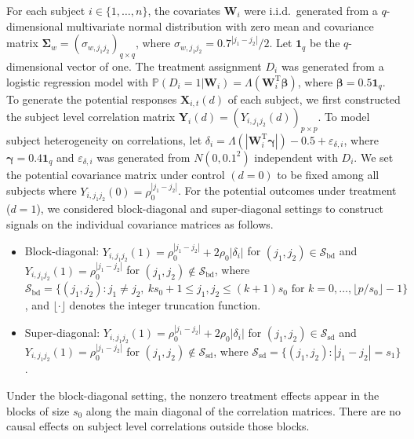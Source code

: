 \documentclass[12pt]{article}
\def\T{{ \mathrm{\scriptscriptstyle T} }}
\theoremstyle{definition}
\newcommand{\bW}{{\mathbf W}}
\newcommand{\bX}{{\mathbf X}}
\newcommand{\bY}{{\mathbf Y}}
\newcommand{\bbeta}  {\boldsymbol{\beta}}
\newcommand{\bSigma}{\boldsymbol{\Sigma}}
\newcommand{\bgamma}{\boldsymbol{\gamma}}
\begin{document}
For each subject $i \in \{1, \ldots, n\}$, the covariates $\bW_i$ were i.i.d.\ generated from a $q$-dimensional multivariate normal distribution with zero mean and covariance matrix $\bSigma_{w} = (\sigma_{w, j_1j_2})_{q \times q}$, where $\sigma_{w, j_1j_2} = 0.7^{|j_1-j_2|} / 2$.
Let $\mathbf{1}_q$ be the $q$-dimensional vector of one. 
The treatment assignment $D_i$ was generated from a logistic regression model with 
$\mathbb{P}(D_{i} = 1|\bW_i) = \Lambda(\bW_{i}^{\T}\bbeta)$, where 
$\bbeta = 0.5 \mathbf{1}_q$.
To generate the potential responses $\bX_{i, t}(d)$ of each subject, we first constructed the subject level correlation matrix $\bY_{i}(d) = (Y_{i, j_1j_2}(d))_{p \times p}$. 
To model subject heterogeneity on correlations, let $\delta_{i} = \Lambda(|\bW_{i}^{\T}\bgamma|) - 0.5 + \varepsilon_{\delta, i}$, where $\bgamma = 0.4 \mathbf{1}_q$ and $\varepsilon_{\delta, i}$ was generated from $N(0, 0.1^{2})$ 
independent with $D_i$. 
We set the potential covariance matrix under control $(d = 0)$ to be fixed among all subjects where $Y_{i, j_1j_2}(0) = \rho_{0}^{|j_1-j_2|}$. 
For the potential outcomes under treatment ($d = 1$), we considered block-diagonal and super-diagonal settings to construct signals on the individual covariance matrices as follows.
\begin{itemize}
\item Block-diagonal: $Y_{i, j_1j_2}(1) = \rho_{0}^{|j_1-j_2|} +2 \rho_{0}|\delta_{i}| $ for $(j_1, j_2) \in \mathcal{S}_{\mathrm{\scriptstyle bd}}$ and $Y_{i, j_1j_2}(1) = \rho_{0}^{|j_1-j_2|}$ for $(j_1, j_2) \not\in \mathcal{S}_{\mathrm{\scriptstyle bd}}$, where $\mathcal{S}_{\mathrm{\scriptstyle bd}} = \{(j_1, j_2): j_1 \neq j_2, \ ks_0 + 1 \leq j_1, j_2 \leq (k + 1) s_0 \mbox{ \ for \ } k=0, \ldots, \lfloor p / s_0 \rfloor - 1\}$, and $\lfloor \cdot \rfloor$ denotes the integer truncation function.

\item Super-diagonal: $Y_{i, j_1j_2}(1) = \rho_{0}^{|j_1-j_2|} +2 \rho_{0}|\delta_{i}| $ for $(j_1, j_2) \in \mathcal{S}_{\mathrm{\scriptstyle sd}}$ and $Y_{i, j_1j_2}(1) = \rho_{0}^{|j_1-j_2|}$ for $(j_1, j_2) \not\in \mathcal{S}_{\mathrm{\scriptstyle sd}}$, where $\mathcal{S}_{\mathrm{\scriptstyle sd}} = \{(j_1, j_2): |j_1 - j_2| = s_1\}$.
\end{itemize}
Under the block-diagonal setting, the nonzero treatment effects appear in the blocks of size $s_0$ along the main diagonal of the correlation matrices. There are no causal effects on subject level correlations outside those blocks.
\end{document}
